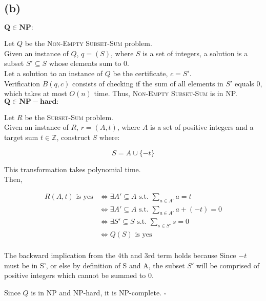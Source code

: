 \newpage
\subsection*{(b)}

\(\mathbf{Q \in NP:}\)

Let \( Q \) be the \textsc{Non-Empty Subset-Sum} problem.\\
Given an instance of \( Q \), \( q = (S) \), 
where \( S \) is a set of integers, a solution is a subset \( S' \subseteq S \) whose elements sum to \( 0 \).\\
Let a solution to an instance of \( Q \) be the certificate, \( c = S' \).\\

Verification \( B(q,c) \) consists of checking if the sum of all elements in \( S' \) equals \( 0 \), which takes at most \( O(n) \) time. Thus, \textsc{Non-Empty Subset-Sum} is in NP.\\

\(\mathbf{Q \in NP-hard:}\)

Let \( R \) be the \textsc{Subset-Sum} problem.\\
Given an instance of \( R \), \( r = (A, t) \), 
where \( A \) is a set of positive integers and a target sum \( t \in \mathbb{Z} \), construct \( S \) where:

\[
S = A \cup \{-t\}
\]

This transformation takes polynomial time.\\

Then,

\begin{equation}
    \begin{split}
        R(A, t) \text{ is yes} & \iff \exists A' \subseteq A \text{ s.t. } \sum_{a \in A'} a = t \\
        &\iff \exists A' \subseteq A \text{ s.t. } \sum_{a \in A'} a + (-t) = 0 \\
        &\iff \exists S' \subseteq S \text{ s.t. } \sum_{s \in S'} s = 0 \\
        &\iff Q(S) \text{ is yes}\\
    \end{split}
\end{equation}

The backward implication from the 4th and 3rd term holds because
Since $-t$ must be in S', or else by definition of S and A, the subset $S'$ will be comprised of positive integers
which cannot be summed to 0.


Since \( Q \) is in NP and NP-hard, it is NP-complete. \(\square\)

